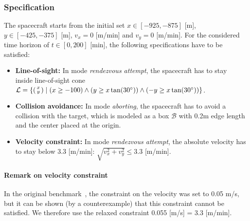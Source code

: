 \documentclass[EPiC]{easychair}
\begin{document}
\subsubsection{Specification}

The spacecraft starts from the initial set $x \in [-925,-875]$ [m], $y \in [-425,-375]$ [m], $v_x = 0$ [m/min] and $v_y = 0$ [m/min]. For the considered time horizon of $t \in [0,200]$ [min], the following specifications have to be satisfied:

\begin{itemize}
\item \textbf{Line-of-sight:} In mode \textit{rendezvous attempt}, the spacecraft has to stay \\
inside line-of-sight cone $\mathcal{L} = \{ \begin{psmallmatrix}x \\ y\end{psmallmatrix} \mid (x \geq -100) \land (y \geq x \tan(30^\circ)) \land (-y \geq x \tan(30^\circ))\}$.
%
\item \textbf{Collision avoidance:} In mode \textit{aborting}, the spacecraft has to avoid a collision with the target, which is modeled as a box $\mathcal{B}$ with 0.2m edge length and the center placed at the origin.
%
\item \textbf{Velocity constraint:} In mode \textit{rendezvous attempt}, the absolute velocity has to stay below $3.3$ [m/min]: $\sqrt{v_x^2 + v_y^2}\leq 3.3$ [m/min].
\end{itemize}

\paragraph{Remark on velocity constraint} In the original benchmark~\cite{Chan2017a}, the constraint on the velocity was set to 0.05 m/s, but it can be shown (by a counterexample) that this constraint cannot be satisfied. We therefore use the relaxed constraint 0.055 [m/s] = 3.3 [m/min].

\end{document}
